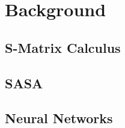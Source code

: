 \section{Background} \label{sec:background}

\subsection{S-Matrix Calculus} \label{sec:s_mats}

\clearpage

\subsection{SASA}\label{sec:SASA}

\clearpage

\subsection{Neural Networks} \label{sec:NN_bg}

